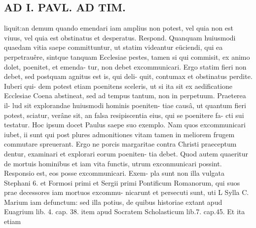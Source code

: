 \documentclass{article}
\begin{document}
\begin{pages}
\section*{AD I. PAVL. AD TIM. }
\marginpar{[ p.330 ]}liquit:an demum quando emendari iam amplius non potest, vel quia non est viuus, vel quia est obstinatus et desperatus. Respond. Quanquam huiusmodi quaedam vitia saepe committuntur, ut statim videantur eüciendi, qui ea perpetrauêre, sintque tanquam Ecclesiae pestes, tamen si qui commisit, ex animo dolet, poenitet, et emenda- tur, non debet excommunicari. Ergo statim fieri non debet, sed postquam agnitus est is, qui deli- quit, contumax et obstinatus perdite. Iuberi qui- dem potest etiam poenitens sceleris, ut si ita sit ex aedificatione Ecclesiae Coena abstineat, sed ad tempus tantum, non in perpetuum. Praeterea il- lud sit explorandae huiusmodi hominis poeniten- tiae causâ, ut quantum fieri potest, sciatur, verâne sit, an falsa resipiscentia eius, qui se poenitere fa- cti sui testatur. Hoc ipsum docet Paulus saepe suo exemplo. Nam quos excommunicari iubet, ii sunt qui post plures admonitiones vitam tamen in meliorem frugem commutare spreuerant. Ergo ne porcis margaritae contra Christi praeceptum dentur, examinari et explorari eorum poeniten- tia debet. Quod autem quaeritur de mortuis hominibus et iam vita functis, utrum exconmunicari possint. Responsio est, eos posse excommunicari. Exem- pla sunt non illa vulgata Stephani 6. et Formosi primi et Sergii primi Pontificum Romanorum, qui suos prae decessores iam mortuos excommu- nicarunt et persecuti sunt, uti L Sylla C. Marium iam defunctum: sed illa potius, de quibus historiae extant apud Euagrium lib. 4. cap. 38. item apud Socratem Scholasticum lib.7. cap.45. Et ita etiam 

\end{pages}
\end{document}
